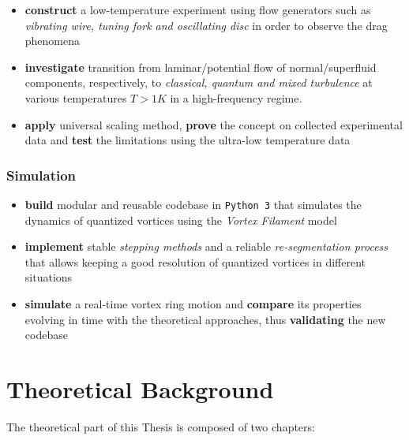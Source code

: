	\begin{itemize}
		\item \textbf{construct} a low-temperature experiment using flow generators such as \textit{vibrating wire, tuning fork and oscillating disc} in order to observe the drag phenomena
		\item \textbf{investigate} transition from laminar/potential flow of normal/superfluid components, respectively, to \textit{classical, quantum and mixed turbulence} at various temperatures $T > 1\unit{K}$ in a high-frequency regime.
		\item \textbf{apply} universal scaling method, \textbf{prove} the concept on collected experimental data and \textbf{test} the limitations using the ultra-low temperature data
	\end{itemize}

	\subsection*{Simulation}
	\begin{itemize}
		\item \textbf{build} modular and reusable codebase in \texttt{Python 3} that simulates the dynamics of quantized vortices using the \textit{Vortex Filament} model
		\item \textbf{implement} stable \textit{stepping methods} and a reliable \textit{re-segmentation process} that allows keeping a good resolution of quantized vortices in different situations
		\item \textbf{simulate} a real-time vortex ring motion and \textbf{compare} its properties evolving in time with the theoretical approaches, thus \textbf{validating} the new codebase
	\end{itemize}

\newpage


\chapter{Theoretical Background}

The theoretical part of this Thesis is composed of two chapters:

